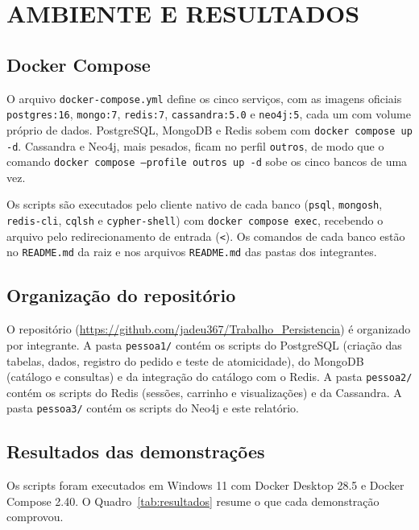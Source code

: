 \documentclass[12pt,a4paper,oneside]{article}
\newcommand{\Repositorio}{https://github.com/jadeu367/Trabalho_Persistencia}
\begin{document}
\section{AMBIENTE E RESULTADOS}

\subsection{Docker Compose}

O arquivo \texttt{docker-compose.yml} define os cinco serviços, com as imagens oficiais \texttt{postgres:16}, \texttt{mongo:7}, \texttt{redis:7}, \texttt{cassandra:5.0} e \texttt{neo4j:5}, cada um com volume próprio de dados. PostgreSQL, MongoDB e Redis sobem com \texttt{docker compose up -d}. Cassandra e Neo4j, mais pesados, ficam no perfil \texttt{outros}, de modo que o comando \texttt{docker compose --profile outros up -d} sobe os cinco bancos de uma vez.

Os scripts são executados pelo cliente nativo de cada banco (\texttt{psql}, \texttt{mongosh}, \texttt{redis-cli}, \texttt{cqlsh} e \texttt{cypher-shell}) com \texttt{docker compose exec}, recebendo o arquivo pelo redirecionamento de entrada (\texttt{<}). Os comandos de cada banco estão no \texttt{README.md} da raiz e nos arquivos \texttt{README.md} das pastas dos integrantes.

\subsection{Organização do repositório}

O repositório (\url{\Repositorio}) é organizado por integrante. A pasta \texttt{pessoa1/} contém os scripts do PostgreSQL (criação das tabelas, dados, registro do pedido e teste de atomicidade), do MongoDB (catálogo e consultas) e da integração do catálogo com o Redis. A pasta \texttt{pessoa2/} contém os scripts do Redis (sessões, carrinho e visualizações) e da Cassandra. A pasta \texttt{pessoa3/} contém os scripts do Neo4j e este relatório.

\subsection{Resultados das demonstrações}

Os scripts foram executados em Windows 11 com Docker Desktop 28.5 e Docker Compose 2.40. O Quadro~\ref{tab:resultados} resume o que cada demonstração comprovou.
\end{document}
